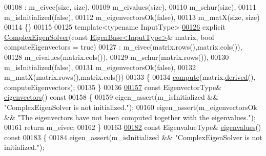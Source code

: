 \begin{DoxyCode}
00108             : m\_eivec(size, size),
00109               m\_eivalues(size),
00110               m\_schur(size),
00111               m\_isInitialized(false),
00112               m\_eigenvectorsOk(false),
00113               m\_matX(size, size)
00114     \{\}
00115 
00125     \textcolor{keyword}{template}<\textcolor{keyword}{typename} InputType>
\hyperlink{group___eigenvalues___module_a748de5c1e7f730e16421e6d451437600}{00126}     \textcolor{keyword}{explicit} \hyperlink{group___eigenvalues___module_a748de5c1e7f730e16421e6d451437600}{ComplexEigenSolver}(\textcolor{keyword}{const} \hyperlink{group___core___module_struct_eigen_1_1_eigen_base}{EigenBase<InputType>}& matrix, \textcolor{keywordtype}{
      bool} computeEigenvectors = \textcolor{keyword}{true})
00127             : m\_eivec(matrix.rows(),matrix.cols()),
00128               m\_eivalues(matrix.cols()),
00129               m\_schur(matrix.rows()),
00130               m\_isInitialized(false),
00131               m\_eigenvectorsOk(false),
00132               m\_matX(matrix.rows(),matrix.cols())
00133     \{
00134       \hyperlink{group___eigenvalues___module_aeb7e38c6db5369f5c974f3786e94c1f0}{compute}(matrix.\hyperlink{group___core___module_a324b16961a11d2ecfd2d1b7dd7946545}{derived}(), computeEigenvectors);
00135     \}
00136 
\hyperlink{group___eigenvalues___module_a3aa5e27800349990778da8fa532c1270}{00157}     \textcolor{keyword}{const} EigenvectorType& \hyperlink{group___eigenvalues___module_a3aa5e27800349990778da8fa532c1270}{eigenvectors}()\textcolor{keyword}{ const}
00158 \textcolor{keyword}{    }\{
00159       eigen\_assert(m\_isInitialized && \textcolor{stringliteral}{"ComplexEigenSolver is not initialized."});
00160       eigen\_assert(m\_eigenvectorsOk && \textcolor{stringliteral}{"The eigenvectors have not been computed together with the
       eigenvalues."});
00161       \textcolor{keywordflow}{return} m\_eivec;
00162     \}
00163 
\hyperlink{group___eigenvalues___module_a10c25c7620e7faedcd39991cce3a757b}{00182}     \textcolor{keyword}{const} EigenvalueType& \hyperlink{group___eigenvalues___module_a10c25c7620e7faedcd39991cce3a757b}{eigenvalues}()\textcolor{keyword}{ const}
00183 \textcolor{keyword}{    }\{
00184       eigen\_assert(m\_isInitialized && \textcolor{stringliteral}{"ComplexEigenSolver is not initialized."});

\end{DoxyCode}
